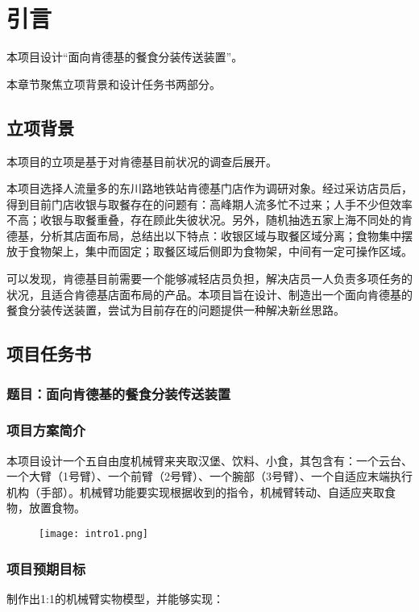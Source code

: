 
\chapter{引言}
本项目设计“面向肯德基的餐食分装传送装置”。

本章节聚焦立项背景和设计任务书两部分。

\section{立项背景}
本项目的立项是基于对肯德基目前状况的调查后展开。

本项目选择人流量多的东川路地铁站肯德基门店作为调研对象。经过采访店员后，得到目前门店收银与取餐存在的问题有：高峰期人流多忙不过来；人手不少但效率不高；收银与取餐重叠，存在顾此失彼状况。另外，随机抽选五家上海不同处的肯德基，分析其店面布局，总结出以下特点：收银区域与取餐区域分离；食物集中摆放于食物架上，集中而固定；取餐区域后侧即为食物架，中间有一定可操作区域。

可以发现，肯德基目前需要一个能够减轻店员负担，解决店员一人负责多项任务的状况，且适合肯德基店面布局的产品。本项目旨在设计、制造出一个面向肯德基的餐食分装传送装置，尝试为目前存在的问题提供一种解决新丝思路。
\section{项目任务书}


\subsection{题目：面向肯德基的餐食分装传送装置}

\subsection{项目方案简介}
本项目设计一个五自由度机械臂来夹取汉堡、饮料、小食，其包含有：一个云台、一个大臂（1号臂）、一个前臂（2号臂）、一个腕部（3号臂）、一个自适应末端执行机构（手部）。机械臂功能要实现根据收到的指令，机械臂转动、自适应夹取食物，放置食物。

\begin{figure}[h]
  \centering
  \texttt{[image: intro1.png]}
  
\end{figure}

\subsection{项目预期目标}
制作出1:1的机械臂实物模型，并能够实现：

